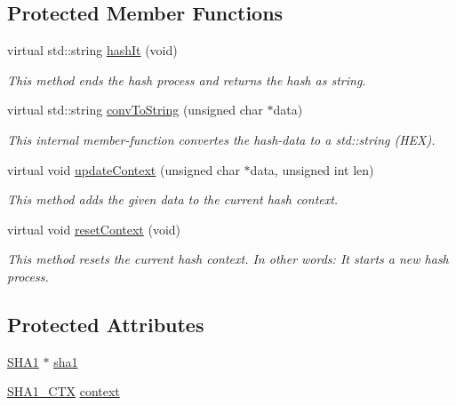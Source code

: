 \subsection*{Protected Member Functions}
\begin{DoxyCompactItemize}
\item 
virtual std::string \hyperlink{classsha1wrapper_a88f493c77f0655eb0b8e577226c49904}{hashIt} (void)
\begin{DoxyCompactList}\small\item\em This method ends the hash process and returns the hash as string. \item\end{DoxyCompactList}\item 
virtual std::string \hyperlink{classsha1wrapper_a1339f960e306c6bde056191d66001152}{convToString} (unsigned char $\ast$data)
\begin{DoxyCompactList}\small\item\em This internal member-\/function convertes the hash-\/data to a std::string (HEX). \item\end{DoxyCompactList}\item 
virtual void \hyperlink{classsha1wrapper_af862f411a597be53682cbce6177e06e6}{updateContext} (unsigned char $\ast$data, unsigned int len)
\begin{DoxyCompactList}\small\item\em This method adds the given data to the current hash context. \item\end{DoxyCompactList}\item 
virtual void \hyperlink{classsha1wrapper_a8ab1d20a43a4768df03799a14cfbb6b6}{resetContext} (void)
\begin{DoxyCompactList}\small\item\em This method resets the current hash context. In other words: It starts a new hash process. \item\end{DoxyCompactList}\end{DoxyCompactItemize}
\subsection*{Protected Attributes}
\begin{DoxyCompactItemize}
\item 
\hyperlink{class_s_h_a1}{SHA1} $\ast$ \hyperlink{classsha1wrapper_ad0360326a2201b79786f0dd2fcc42279}{sha1}
\item 
\hyperlink{struct_s_h_a1___c_t_x}{SHA1\_\-CTX} \hyperlink{classsha1wrapper_a7b9e5651faf4a23cf6fccebca11a801e}{context}
\end{DoxyCompactItemize}


